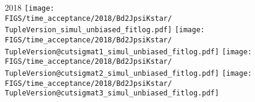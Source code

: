 \begin{frame}
  2018
  \texttt{[image: \\FIGS/time\_acceptance/2018/Bd2JpsiKstar/\\TupleVersion\_simul\_unbiased\_fitlog.pdf]}
  \texttt{[image: \\FIGS/time\_acceptance/2018/Bd2JpsiKstar/\\TupleVersion@cutsigmat1\_simul\_unbiased\_fitlog.pdf]}
  \texttt{[image: \\FIGS/time\_acceptance/2018/Bd2JpsiKstar/\\TupleVersion@cutsigmat2\_simul\_unbiased\_fitlog.pdf]}
  \texttt{[image: \\FIGS/time\_acceptance/2018/Bd2JpsiKstar/\\TupleVersion@cutsigmat3\_simul\_unbiased\_fitlog.pdf]}

\end{frame} %



